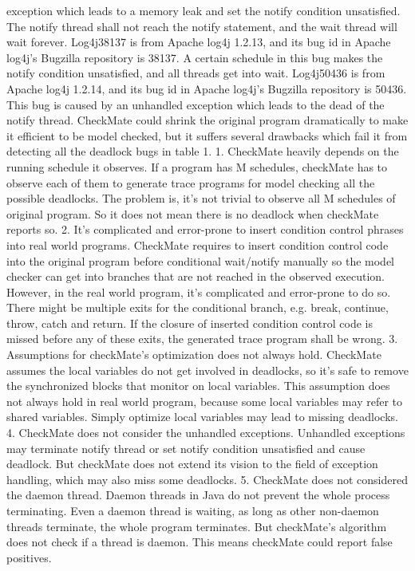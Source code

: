 \documentclass{article}
\begin{document}
 exception which leads to a memory leak and set the notify condition unsatisfied. The notify thread shall not reach the notify statement, and the wait thread will wait forever.
Log4j38137 is from Apache log4j 1.2.13, and its bug id in Apache log4j’s Bugzilla repository is 38137. A certain schedule in this bug makes the notify condition unsatisfied, and all threads get into wait.
Log4j50436 is from Apache log4j 1.2.14, and its bug id in Apache log4j’s Bugzilla repository is 50436. This bug is caused by an unhandled exception which leads to the dead of the notify thread.
CheckMate could shrink the original program dramatically to make it efficient to be model checked, but it suffers several drawbacks which fail it from detecting all the deadlock bugs in table 1.
1.	CheckMate heavily depends on the running schedule it observes. If a program has M schedules, checkMate has to observe each of them to generate trace programs for model checking all the possible deadlocks. The problem is, it’s not trivial to observe all M schedules of original program. So it does not mean there is no deadlock when checkMate reports so.
2.	It’s complicated and error-prone to insert condition control phrases into real world programs. CheckMate requires to insert condition control code into the original program before conditional wait/notify manually so the model checker can get into branches that are not reached in the observed execution. However, in the real world program, it’s complicated and error-prone to do so. There might be multiple exits for the conditional branch, e.g. break, continue, throw, catch and return. If the closure of inserted condition control code is missed before any of these exits, the generated trace program shall be wrong.
3.	Assumptions for checkMate’s optimization does not always hold. CheckMate assumes the local variables do not get involved in deadlocks, so it’s safe to remove the synchronized blocks that monitor on local variables. This assumption does not always hold in real world program, because some local variables may refer to shared variables. Simply optimize local variables may lead to missing deadlocks.
4.	CheckMate does not consider the unhandled exceptions. Unhandled exceptions may terminate notify thread or set notify condition unsatisfied and cause deadlock. But checkMate does not extend its vision to the field of exception handling, which may also miss some deadlocks.
5.	CheckMate does not considered the daemon thread. Daemon threads in Java do not prevent the whole process terminating. Even a daemon thread is waiting, as long as other non-daemon threads terminate, the whole program terminates. But checkMate’s algorithm does not check if a thread is daemon. This means checkMate could report false positives.

\renewcommand\refname{References}


\end{document}
